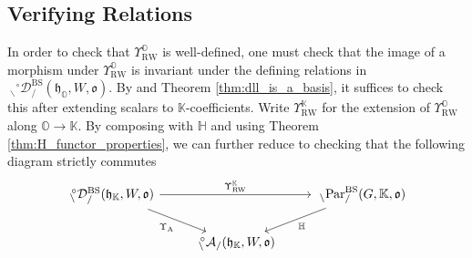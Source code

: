 \documentclass{amsart}
\renewcommand{\O}{\mathbb{O}}
\newcommand{\K}{\mathbb{K}}
\renewcommand{\H}{\mathbb{H}}
\newcommand{\fr}[1]{\mathfrak{#1}}
\DeclareMathOperator{\RW}{RW}
\DeclareMathOperator{\Abe}{A}
\DeclareMathOperator{\BS}{BS}
\newcommand{\PEE}[2]{\:_{#1 \backslash} \textnormal{Par}_{/ #2} }
\newcommand{\grEWmon}[2]{\:_{#1 \backslash} \!\! {}^{\circ} \mathcal{D}_{/ #2} }
\newcommand{\grAmon}[2]{\:_{#1 \backslash} \!\! {}^{\circ} \mathcal{A}_{/ #2} }
\theoremstyle{definition}
\numberwithin{equation}{subsection}
\begin{document}
\subsection{Verifying Relations}

In order to check that $\Upsilon_{\RW}^{\O}$ is well-defined, one must check that the image of a morphism under $\Upsilon_{\RW}^{\O}$ is invariant under the defining relations in $\grEWmon{}{}^{\BS} (\fr{h}_{\O}, W, \fr{o})$.
By \cite[Lemma 3.6.5]{Sandvik} and Theorem \ref{thm:dll_is_a_basis}, it suffices to check this after extending scalars to $\K$-coefficients.
Write $\Upsilon_{\RW}^{\K}$ for the extension of $\Upsilon_{\RW}^{\O}$ along $\O \to \K$.
By composing with $\H$ and using Theorem \ref{thm:H_functor_properties}, we can further reduce to checking that the following diagram strictly commutes
\[\begin{tikzcd}
    {\grEWmon{}{}^{\BS} (\fr{h}_{\K}, W, \fr{o})} \arrow[rr, "\Upsilon_{\RW}^{\K}"] \arrow[rd, "\Upsilon_{\Abe}"'] &                                       & \PEE{}{}^{\BS} (G, \K, \fr{o}) \arrow[ld, "\H"] \\
                                                                                        & {\grAmon{}{} (\fr{h}_{\K}, W,  \fr{o})} &                                     
    \end{tikzcd}\]
\end{document}
